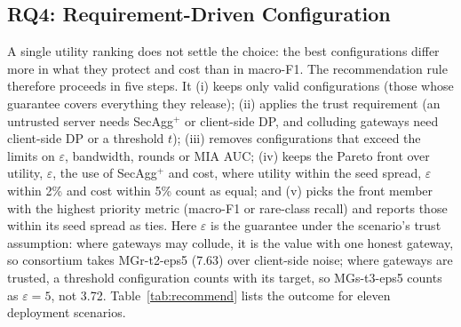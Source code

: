 \subsection{RQ4: Requirement-Driven Configuration}\label{subsec:rq4}
A single utility ranking does not settle the choice: the best configurations differ more in what they protect and cost than in macro-F1. The recommendation rule therefore proceeds in five steps. It (i) keeps only valid configurations (those whose guarantee covers everything they release); (ii) applies the trust requirement (an untrusted server needs SecAgg$^+$ or client-side DP, and colluding gateways need client-side DP or a threshold $t$); (iii) removes configurations that exceed the limits on $\varepsilon$, bandwidth, rounds or MIA AUC; (iv) keeps the Pareto front over utility, $\varepsilon$, the use of SecAgg$^+$ and cost, where utility within the seed spread, $\varepsilon$ within 2\% and cost within 5\% count as equal; and (v) picks the front member with the highest priority metric (macro-F1 or rare-class recall) and reports those within its seed spread as ties. Here $\varepsilon$ is the guarantee under the scenario's trust assumption: where gateways may collude, it is the value with one honest gateway, so consortium takes MGr-t2-eps5 (7.63) over client-side noise; where gateways are trusted, a threshold configuration counts with its target, so MGs-t3-eps5 counts as $\varepsilon = 5$, not 3.72. Table~\ref{tab:recommend} lists the outcome for eleven deployment scenarios.

